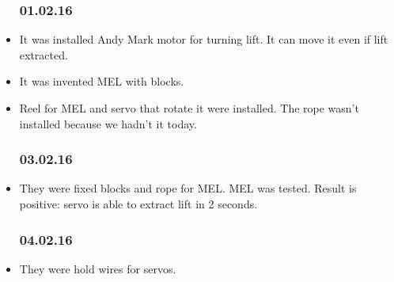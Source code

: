 \begin{itemize}
	\subsubsection{01.02.16}		
		\item It was installed Andy Mark motor for turning lift. It can move it even if lift extracted.
		\item It was invented MEL with blocks.
		\item Reel for MEL and servo that rotate it were installed. The rope wasn't installed because we hadn't it today.
	\subsubsection{03.02.16}
		\item They were fixed blocks and rope for MEL. MEL was tested. Result is positive: servo is able to extract lift in 2 seconds.
	\subsubsection{04.02.16}
		\item They were hold wires for servos.		
\end{itemize}		
\fillpage